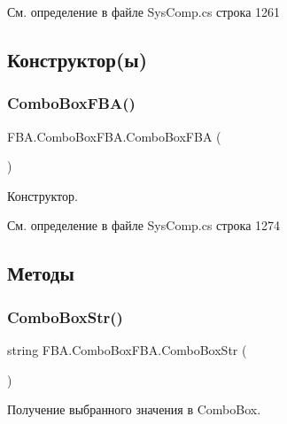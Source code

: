 См. определение в файле Sys\+Comp.\+cs строка 1261



\subsection{Конструктор(ы)}
\mbox{\label{class_f_b_a_1_1_combo_box_f_b_a_ad9047eb958e2393f895fae537fdde597}} 
\subsubsection{\texorpdfstring{Combo\+Box\+F\+B\+A()}{ComboBoxFBA()}}
{\footnotesize\ttfamily F\+B\+A.\+Combo\+Box\+F\+B\+A.\+Combo\+Box\+F\+BA (\begin{DoxyParamCaption}{ }\end{DoxyParamCaption})}



Конструктор. 



См. определение в файле Sys\+Comp.\+cs строка 1274



\subsection{Методы}
\mbox{\label{class_f_b_a_1_1_combo_box_f_b_a_a43f7d2e7d271590ca56c4234cf30da1b}} 
\subsubsection{\texorpdfstring{Combo\+Box\+Str()}{ComboBoxStr()}}
{\footnotesize\ttfamily string F\+B\+A.\+Combo\+Box\+F\+B\+A.\+Combo\+Box\+Str (\begin{DoxyParamCaption}{ }\end{DoxyParamCaption})}



Получение выбранного значения в Combo\+Box. 

